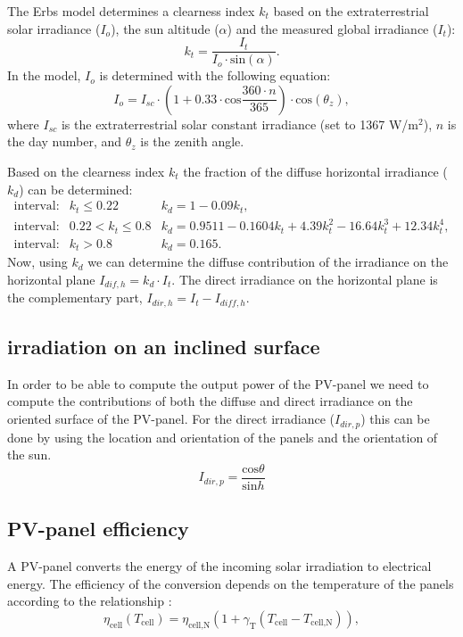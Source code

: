 The Erbs model determines a clearness index $k_t$ based on the extraterrestrial solar irradiance ($I_o$), the sun altitude ($\alpha$) and the measured global irradiance ($I_t$):
\begin{equation}
	k_t = \frac{I_t}{I_o\cdot \text{sin}\left(\alpha\right)}.
\end{equation}
In the model, $I_o$ is determined with the following equation:
\begin{equation}
	I_o = I_{sc} \cdot \left(1 + 0.33\cdot\text{cos}\frac{360\cdot n}{365}\right)\cdot \text{cos}\left(\theta_z\right) ,
\end{equation}
where $I_{sc}$ is the extraterrestrial solar constant irradiance (set to 1367 W/$\text{m}^2$), $n$ is the day number, and $\theta_z$ is the zenith angle.

Based on the clearness index $k_t$ the fraction of the diffuse horizontal irradiance ($k_d$) can be determined:
\begin{eqnarray}
	\text{interval:} & k_t \leq 0.22 & k_d = 1 - 0.09k_t ,\\
	\text{interval:} & 0.22 < k_t \leq 0.8 & k_d = 0.9511 - 0.1604 k_t + 4.39 k_t^2 -16.64 k_t^3 + 12.34 k_t^4 , \\
	\text{interval:} & k_t > 0.8 & k_d = 0.165 .
\label{eq:diffuse_fraction}
\end{eqnarray} 
Now, using $k_d$ we can determine the diffuse contribution of the irradiance on the horizontal plane $I_{dif,h} = k_d \cdot I_t$. The direct irradiance on the horizontal plane is the complementary part, $I_{dir,h} = I_t - I_{diff,h}$. 

\subsection{irradiation on an inclined surface}
In order to be able to compute the output power of the PV-panel we need to compute the contributions of both the diffuse and direct irradiance on the oriented surface of the PV-panel. For the direct irradiance ($I_{dir,p}$) this can be done by using the location and orientation of the panels and the orientation of the sun.
\begin{equation}
		I_{dir,p} = \frac{\text{cos}\theta}{\text{sin}h}
\label{eq:direct_plane}
\end{equation}
 



\subsection{PV-panel efficiency}
A PV-panel converts the energy of the incoming solar irradiation to electrical energy. The efficiency of the conversion depends on the temperature of the panels according to the relationship \cite{VanderSluys2021}:
\begin{equation}
  \eta_{\text{cell}}(T_{\text{cell}}) = \eta_{\text{cell,N}} \left( 1 + \gamma_{\text{T}}\left(T_{\text{cell}} - T_{\text{cell,N}} \right) \right),
	\label{eq:efficiency_pv}
\end{equation}   

